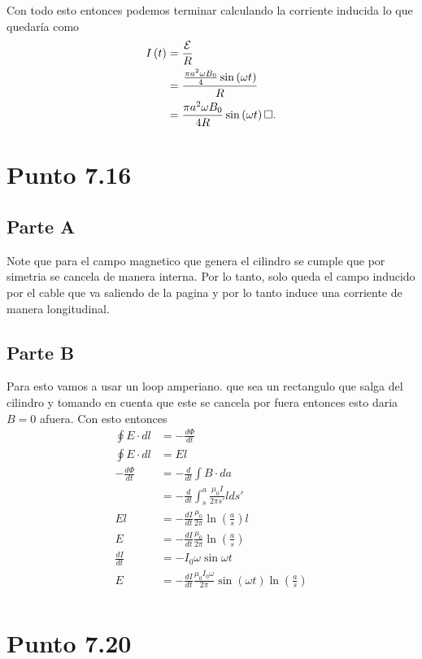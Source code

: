 \documentclass{report}
\renewcommand{\qed}{\hfill\square}
\begin{document}
Con todo esto entonces podemos terminar calculando la corriente inducida lo que quedaría como
\begin{align*}
  I\left( t \right) &= \frac{\mathcal{E}}{R}\\
  &= \frac{\frac{\pi a^2 \omega B_0}{4}\sin\left( \omega t \right) }{R} \\
  &= \frac{\pi a^2 \omega B_0}{4R}\sin\left( \omega t \right)\qed
.\end{align*}

\chapter{Punto 7.16}

\section{Parte A}

Note que para el campo magnetico que genera el cilindro se cumple que por simetria se cancela de manera interna. Por lo tanto, solo queda el campo inducido por el cable que va saliendo de la pagina y por lo tanto induce una corriente de manera longitudinal.

\section{Parte B}

Para esto vamos a usar un loop amperiano. que sea un rectangulo que salga del cilindro y tomando en cuenta que este se cancela por fuera entonces esto daria $B=0$ afuera. Con esto entonces
\begin{align*}
	\oint E \cdot dl &= - \frac{d\Phi}{dt}\\
	\oint E \cdot dl &= El\\
	- \frac{d\Phi}{dt} &= -\frac{d}{dt} \int B \cdot da\\
	&= - \frac{d}{dt}\int_s^a \frac{\mu_0 I}{2\pi s'}l ds'\\
	El &= - \frac{dI}{dt} \frac{\mu_0}{2\pi}\ln\left(\frac{a}{s}\right)l\\
	E &= - \frac{dI}{dt} \frac{\mu_0}{2\pi}\ln\left(\frac{a}{s}\right)\\
	\frac{dI}{dt} &= - I_0 \omega \sin \omega t\\
	E &= - \frac{dI}{dt} \frac{\mu_0I_0 \omega}{2\pi}\sin(\omega t)\ln\left(\frac{a}{s}\right)\\
\end{align*}

\chapter{Punto 7.20}
\end{document}

